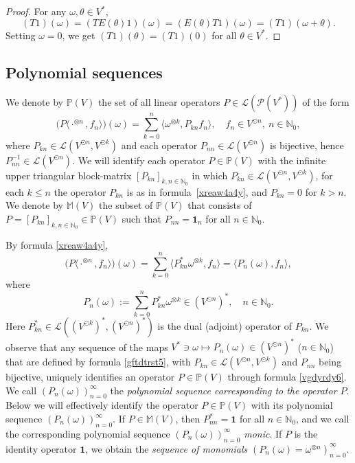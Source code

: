 \documentclass[12pt]{article}
\theoremstyle{remark}
\theoremstyle{remark}
\theoremstyle{remark}
\begin{document}
\begin{proof}For any $\omega, \theta \in V^*$, $$(T 1)(\omega)=(T E(\theta) 1)(\omega)=(E(\theta)T 1)(\omega)=(T 1)(\omega+\theta).$$
Setting $\omega=0$, we get $(T 1)(\theta)=(T 1)(0)$ for all $\theta \in V^*$. 
\end{proof}

\subsection{Polynomial sequences}

 We denote by $\mathbb P(V)$ the set of all linear operators $P\in\mathcal L(\mathcal P  (V^*))$ of the form  
\begin{equation}\label{xreaw4a4y}
\big(P\langle \cdot^{\otimes n},f_n\rangle\big)(\omega)= \sum_{k=0}^n\langle \omega^{\otimes k},P_{kn}f_n\rangle,\quad f_n\in V^{\odot n},\ n\in\mathbb N_0,
\end{equation} 
where $P_{kn}\in \mathcal L(V^{\odot   n}, V^{\odot   k})$ and each operator $P_{nn} \in \mathcal L(V^{\odot   n})$ is bijective, hence $P_{nn}^{-1}\in \mathcal L(V^{\odot   n})$.  We will identify each operator $P\in \mathbb P(V)$ with the infinite upper triangular block-matrix $[P_{kn}]_{k,n\in \mathbb {N}_0}$ in which $P_{kn}\in \mathcal L(V^{\odot n},V^{\odot k})$, for each $k\le n$ the operator $P_{kn}$ is as in formula~\eqref{xreaw4a4y}, 
  and $P_{kn}=0$ for $k>n$.  We denote by $\mathbb M(V)$ the subset of $\mathbb P(V)$ that consists of $P=[P_{kn}]_{k,n\in \mathbb N_0}\in \mathbb P(V)$ such that $P_{nn}= \mathbf 1_n$ for all $n\in\mathbb N_0$.

  
 
By formula \eqref{xreaw4a4y}, 
\begin{equation}\label{vgdyrdy6}
\big(P\langle \cdot^{\otimes n},f_n\rangle\big)(\omega) =
 \sum_{k=0}^n\langle P_{kn}^* \omega^{\otimes k},f_n\rangle =\langle P_n(\omega),f_n\rangle, \end{equation}
 where 
 \begin{equation}\label{gftdtrst5}P_n(\omega):=\sum_{k=0}^n P_{kn}^*\omega^{\otimes k}\in (V^{\odot n})^*,\quad n\in\mathbb N_0.
 \end{equation} 
 Here $P_{kn}^*\in\mathcal L((V^{\odot k})^*,(V^{\odot n})^*)$ is the dual (adjoint) operator of $P_{kn}$. 
  We observe that any sequence of the maps $V^*\ni\omega
\mapsto P_n(\omega)\in(V^{\odot n})^*$ ($n\in\mathbb N_0$) that are defined by formula \eqref{gftdtrst5}, with  $P_{kn}\in \mathcal L(V^{\odot n},V^{\odot k})$ and $P_{nn}$ being bijective, uniquely identifies an operator $P\in\mathbb P(V)$ through formula \eqref{vgdyrdy6}. We call $(P_n(\omega))_{n=0}^\infty$ the {\it polynomial sequence corresponding to the operator $P$}. Below we will effectively identify the operator  $P\in\mathbb P(V)$  with its polynomial sequence  $(P_n(\omega))_{n=0}^\infty$. If $P\in\mathbb M(V)$, then $P_{nn}^*=\mathbf 1$ for all $n\in\mathbb N_0$, and we call the corresponding polynomial sequence $(P_n(\omega))_{n=0}^\infty$ {\it monic}. 
If $P$ is the identity operator $\mathbf 1$, we obtain the {\it sequence of monomials} $(P_n(\omega)=\omega^{\otimes n})_{n=0}^\infty$. 
\end{document}
